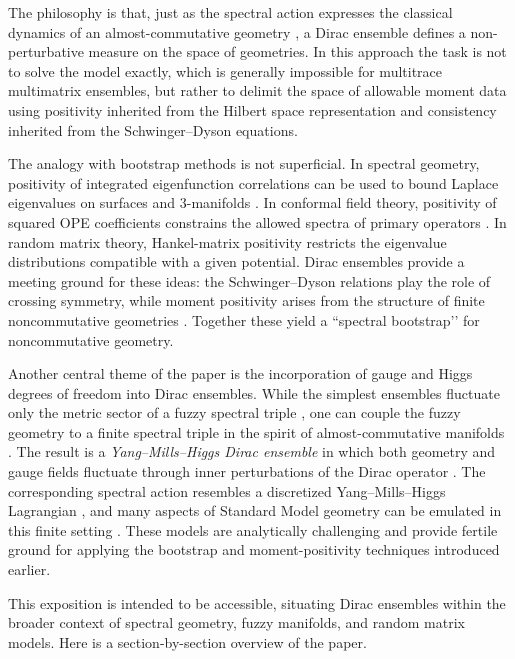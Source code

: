 \documentclass[11pt]{article}
\theoremstyle{plain}
\begin{document}
The philosophy is that, just as the spectral action expresses the classical dynamics of an almost-commutative geometry \cite{Spectral action, Neutrino Mixing, VS}, a Dirac ensemble defines a non-perturbative measure on the space of geometries. In this approach the task is not to solve the 
model exactly,  which is generally impossible for multitrace multimatrix ensembles, but rather to delimit the space of allowable moment data using positivity inherited from the Hilbert space representation and consistency inherited from the Schwinger--Dyson equations.

The analogy with bootstrap methods is not superficial. In spectral geometry, positivity of integrated eigenfunction correlations can be used to bound Laplace eigenvalues on surfaces and 3-manifolds \cite{Bon1, Bon2}. In conformal field theory, positivity of squared OPE coefficients constrains the allowed spectra of primary operators \cite{RRTV}. In random matrix theory, Hankel-matrix positivity restricts the eigenvalue distributions compatible with a given potential. Dirac ensembles provide a meeting ground for these ideas: the Schwinger--Dyson relations play the role of crossing symmetry, while moment positivity arises from the structure of finite noncommutative geometries \cite{hessam2022bootstrapping, hessam2022fromnoncom}. Together these yield a ``spectral bootstrap’’ for noncommutative geometry.

Another central theme of the paper is the incorporation of gauge and Higgs degrees of freedom into Dirac ensembles. While the simplest ensembles fluctuate only the metric sector of a fuzzy spectral triple \cite{Barrett2015, Barrett2016}, one can couple the fuzzy geometry to a finite spectral triple in the spirit of almost-commutative manifolds \cite{Connes-Lott, Spectral action, VS}. The result is a \emph{Yang--Mills--Higgs Dirac ensemble} in which both geometry and gauge fields fluctuate through inner perturbations of the Dirac operator \cite{Connes Inner Fluctuations, Sanchez Yang-Mills}. The corresponding spectral action resembles a discretized Yang--Mills--Higgs Lagrangian \cite{Spectral action, Sanchez Yang-Mills}, and many aspects of Standard Model geometry can be emulated in this finite setting \cite{Finite spectral triples, Neutrino Mixing}. These models are analytically challenging and provide fertile ground for applying the bootstrap and moment-positivity techniques introduced earlier. 


 This exposition is intended to be accessible, situating Dirac ensembles within the broader context of spectral geometry, fuzzy manifolds, and random matrix models.  Here is a section-by-section overview of the paper.
 
\end{document}
